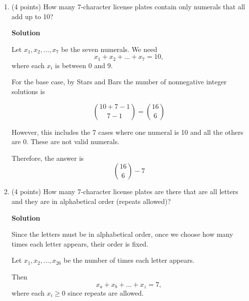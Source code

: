 \documentclass[10pt,letterpaper,unboxed,cm]{article}
\begin{document}
\begin{enumerate}
\begin{enumerate}
Using the Inclusion-Exclusion Principle,

\[ |A' \cup B' \cup C'|
= |A'|+|B'|+|C'| -|A'\cap B'| -|A'\cap C'| -|B'\cap C'| +|A'\cap B'\cap C'|\]

The individual terms ar
\[ |A'|=35^7,\qquad |B'|=35^7,\qquad |C'|=26^7, \]

since excluding A or B leaves 35 choices for each position, while
excluding all numerals leaves 26 choices for each position.

For the intersections,
\[ |A'\cap B'|=34^7, \]
since excluding both A and B leaves 34 choices for each position.

Also,
\[ |A'\cap C'|=25^7,\qquad |B'\cap C'|=25^7, \]
since the plate can only contain letters, with either A or B excluded.

Finally,
\[ |A'\cap B'\cap C'|=24^7,\]
since the plate can only contain letters, with both A and B excluded.

Therefore, the answer is
\[ \boxed{ 36^7-\left(2(35^7)+26^7-34^7-2(25^7)+24^7\right) }
\]

\item
(4 points)
How many 7-character license plates contain only numerals that all add up to 10?

\textbf{Solution}

Let $x_1,x_2,\dots,x_7$ be the seven numerals. We need
\[x_1+x_2+\dots+x_7=10,\]
where each $x_i$ is between 0 and 9.

For the base case, by Stars and Bars the number of
nonnegative integer solutions is

\[\binom{10+7-1}{7-1}=\binom{16}{6}\]

However, this includes the 7 cases where one numeral is 10 and all
the others are 0. These are not valid numerals.

Therefore, the answer is
\[ \boxed{\binom{16}{6}-7}\]


\item
(4 points)
How many 7-character license plates are there that are all letters and they are in alphabetical order (repeats allowed)?

\textbf{Solution}

Since the letters must be in alphabetical order, once we choose how
many times each letter appears, their order is fixed.

Let $x_1,x_2,\ldots,x_{26}$ be the number of times each letter appears.

Then
\[x_a+x_b+\dots+x_{z}=7,\]
where each $x_i \geq 0$ since repeats are allowed.


\end{enumerate}
\end{enumerate}
\end{document}
